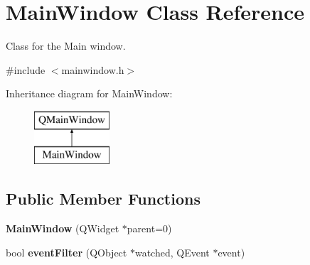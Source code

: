 \hypertarget{class_main_window}{}\section{Main\+Window Class Reference}
\label{class_main_window}


Class for the Main window.  




{\ttfamily \#include $<$mainwindow.\+h$>$}

Inheritance diagram for Main\+Window\+:\begin{figure}[H]
\begin{center}
\leavevmode
\includegraphics[height=2.000000cm]{class_main_window}
\end{center}
\end{figure}
\subsection*{Public Member Functions}
\begin{DoxyCompactItemize}
\item 
\hypertarget{class_main_window_a8b244be8b7b7db1b08de2a2acb9409db}{}{\bfseries Main\+Window} (Q\+Widget $\ast$parent=0)\label{class_main_window_a8b244be8b7b7db1b08de2a2acb9409db}

\item 
\hypertarget{class_main_window_a75d7910a13ccc8ee60126bf7be448341}{}bool {\bfseries event\+Filter} (Q\+Object $\ast$watched, Q\+Event $\ast$event)\label{class_main_window_a75d7910a13ccc8ee60126bf7be448341}

\end{DoxyCompactItemize}
